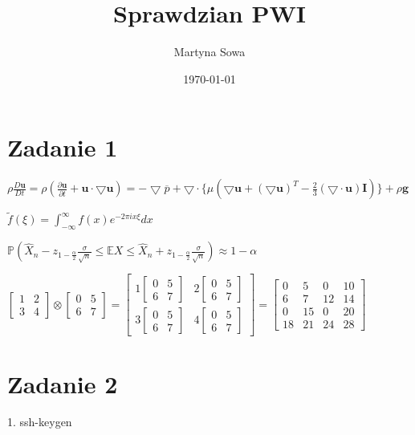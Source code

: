 \documentclass[a4paper]{article}
\author{Martyna Sowa}
\title{Sprawdzian PWI}
\date{\today}
\begin{document}
\section{Zadanie 1}
${\rho \frac{D\textbf{u}}{Dt} = \rho(\frac{\partial\textbf{u}}{\partial t } + \textbf{u} \cdot \bigtriangledown \textbf{u}) = - \bigtriangledown \overline{p} + \bigtriangledown \cdot \{ \mu (\bigtriangledown \textbf{u} + (\bigtriangledown \textbf{u} )^T - \frac{2}{3} (\bigtriangledown \cdot \textbf{u})\textbf{I} ) \} + \rho \textbf{g} }$

\bigskip

${\tilde{f}(\xi)=\int_{-\infty}^{\infty} f(x) e^{-2 \pi i x \xi} dx}$

\bigskip

${\mathbb{P} (\hat{X}_n - z_{1-\frac{\alpha}{2}} \frac{\sigma}{\sqrt{n}} \leq \mathbb{E}X \leq \hat{X}_n + z_{1-\frac{\alpha}{2}} \frac{\sigma}{\sqrt{n}}) \approx 1 - \alpha }$

\bigskip

${
\begin{bmatrix}
1 & 2 \\
3 & 4
\end{bmatrix}
\otimes
\begin{bmatrix}
0 & 5 \\
6 & 7
\end{bmatrix}
=
\begin{bmatrix}
1
\begin{bmatrix}
0 & 5 \\
6 & 7
\end{bmatrix}
&
2
\begin{bmatrix}
0 & 5 \\
6 & 7
\end{bmatrix}
\\
3
\begin{bmatrix}
0 & 5 \\
6 & 7
\end{bmatrix}
& 
4
\begin{bmatrix}
0 & 5 \\
6 & 7
\end{bmatrix}
\end{bmatrix}
=
\begin{bmatrix}
0 & 5 & 0 & 10 \\
6 & 7 & 12 & 14 \\
0 & 15 & 0 & 20 \\
18 & 21 & 24 & 28
\end{bmatrix}
}$

\section{Zadanie 2}
1. ssh-keygen
\end{document}
